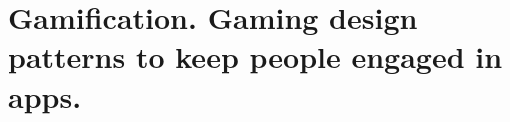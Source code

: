 \chapter[Gamification. Gaming design patterns to keep people engaged in apps.]{Gamification. Gaming design patterns to keep people engaged in apps.}












